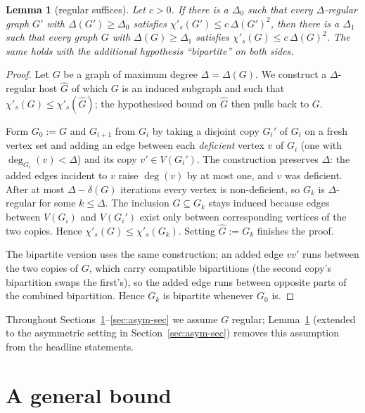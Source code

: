\documentclass[11pt,a4paper]{article}
\newtheorem{lemma}[theorem]{Lemma}
\theoremstyle{definition}
\theoremstyle{remark}
\begin{document}
\begin{lemma}[regular suffices]
\label{lem:wlog-regular}
Let $c > 0$. If there is a $\Delta_0$ such that every
$\Delta$-regular graph $G'$ with $\Delta(G') \geq \Delta_0$ satisfies
$\chi'_s(G') \leq c\,\Delta(G')^2$, then there is a $\Delta_1$ such
that every graph $G$ with $\Delta(G) \geq \Delta_1$ satisfies
$\chi'_s(G) \leq c\,\Delta(G)^2$. The same holds with the additional
hypothesis ``bipartite'' on both sides.
\end{lemma}

\begin{proof}
Let $G$ be a graph of maximum degree $\Delta = \Delta(G)$. We
construct a $\Delta$-regular host $\widehat{G}$ of which $G$ is an
induced subgraph and such that $\chi'_s(G) \leq \chi'_s(\widehat{G})$;
the hypothesised bound on $\widehat{G}$ then pulls back to $G$.

Form $G_0 := G$ and $G_{i+1}$ from $G_i$ by taking a disjoint copy
$G_i'$ of $G_i$ on a fresh vertex set and adding an edge between each
\emph{deficient} vertex $v$ of $G_i$ (one with $\deg_{G_i}(v) < \Delta$)
and its copy $v' \in V(G_i')$. The construction preserves $\Delta$:
the added edges incident to $v$ raise $\deg(v)$ by at most one, and
$v$ was deficient. After at most $\Delta - \delta(G)$ iterations
every vertex is non-deficient, so $G_k$ is $\Delta$-regular for some
$k \leq \Delta$. The inclusion $G \subseteq G_k$ stays induced
because edges between $V(G_i)$ and $V(G_i')$ exist only between
corresponding vertices of the two copies. Hence
$\chi'_s(G) \leq \chi'_s(G_k)$. Setting $\widehat{G} := G_k$
finishes the proof.

The bipartite version uses the same construction; an added edge
$vv'$ runs between the two copies of $G$, which carry compatible
bipartitions (the second copy's bipartition swaps the
first's), so the added edge runs between opposite parts of the
combined bipartition. Hence $G_k$ is bipartite whenever $G_0$ is.
\end{proof}

Throughout
Sections~\ref{sec:general}--\ref{sec:asym-sec} we assume $G$ regular;
Lemma~\ref{lem:wlog-regular} (extended to the asymmetric setting in
Section~\ref{sec:asym-sec}) removes this assumption from the headline
statements.

\section{A general bound}
\label{sec:general}
\end{document}
